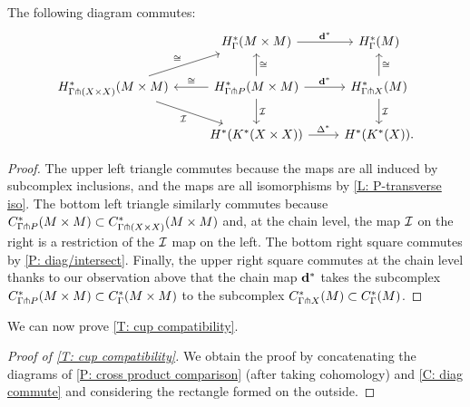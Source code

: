 \documentclass{amsart}
\begin{document}
\begin{corollary}\label{C: diag commute}
	The following diagram commutes:
	\[
	\begin{tikzcd}
		&H^*_{\Gamma}(M \times M) \arrow[r,"\diag^*"]& H^*_{\Gamma}(M) \\
	H^*_{\Gamma \pf (X \times X)}(M \times M)  \arrow[rd,"\mc I"']\arrow[ru,"\cong"] & \arrow[l,"\cong"']H^*_{\Gamma \pf P}(M \times M) \arrow[r,"\diag^*"] \arrow[d,"\mc I"] \arrow[u,"\cong"']& H^*_{\Gamma \pf X}(M) \arrow[d,"\mc I"] \arrow[u,"\cong"'] \\
		&H^*(K^*(X\times X))	\arrow[r,"\Delta^*"] & H^*(K^*(X)) .
	\end{tikzcd}
	\]
\end{corollary}
\begin{proof}
	The upper left triangle commutes because the maps are all induced by subcomplex inclusions, and the maps are all isomorphisms by \cref{L: P-transverse iso}.
	The bottom left triangle similarly commutes because $C^*_{\Gamma \pitchfork P}(M \times M) \subset C^*_{\Gamma \pitchfork (X \times X)}(M \times M)$ and, at the chain level, the map $\mathcal{I}$ on the right is a restriction of the $\mathcal{I}$ map on the left.
	The bottom right square commutes by \cref{P: diag/intersect}.
	Finally, the upper right square commutes at the chain level thanks to our observation above that the chain map $\mathbf{d}^*$ takes the subcomplex $C^*_{\Gamma \pitchfork P}(M \times M) \subset C^*_\Gamma(M \times M)$ to the subcomplex $C^*_{\Gamma \pitchfork X}(M) \subset C^*_\Gamma(M)$.
\end{proof}

We can now prove \cref{T: cup compatibility}.

\begin{proof}[Proof of \cref{T: cup compatibility}]
We obtain the proof by concatenating the diagrams of \cref{P: cross product comparison} (after taking cohomology) and \cref{C: diag commute} and considering the rectangle formed on the outside.
\end{proof}



\begin{comment}
We also have the following.


\begin{lemma}
	The following diagram commutes:
	\[
	\begin{tikzcd}
		H^*_\Gamma(M) \otimes H^*_\Gamma(M) \arrow[r,"\times"] &H^*_{\Gamma}(M \times M) \\
		H^*_{\Gamma \pf X}(M) \otimes H^*_{\Gamma \pf X}(M) \arrow[r,"\times"]\arrow[d,"\mc I \otimes \mc I"]\arrow[u,"\cong"']  & H^*_{\Gamma \pf (X \times X)}(M \times M)  \arrow[d,"\mc I"]\arrow[u,"\cong"']  \\
		H^*(X) \otimes H^*(X) \arrow[r,"\times"]	&H^*(X\times X) .
	\end{tikzcd}
	\]
\end{lemma}
\begin{proof}
	As the product of two cochains transverse to the cubulation is transverse to the product cubulation PROVE/REF!!!, the diagram at the top commutes at the cochain level.
	For the bottom, we compute

\end{proof}
\end{comment}
\end{document}

